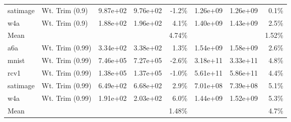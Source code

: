 \begin{table*}[ht]
\begin{center}
\begin{small}
\begin{sc}
\begin{tabular}{llccrccr}
satimage & Wt. Trim (0.9) & 9.87e+02 & 9.76e+02 & -1.2\%  & 1.26e+09 & 1.26e+09 & 0.1\%  \\
w4a & Wt. Trim (0.9) & 1.88e+02 & 1.96e+02 & 4.1\% & 1.40e+09 & 1.43e+09 & 2.5\% \\
\midrule
Mean &  & &  & 4.74\% & & & 1.52\% \\
\midrule
a6a & Wt. Trim (0.99) & 3.34e+02 & 3.38e+02 & 1.3\%  & 1.54e+09 & 1.58e+09 & 2.6\%  \\
mnist & Wt. Trim (0.99) & 7.46e+05 & 7.27e+05 & -2.6\% & 3.18e+11 & 3.33e+11 & 4.8\% \\
rcv1 & Wt. Trim (0.99) & 1.38e+05 & 1.37e+05 & -1.0\% & 5.61e+11 & 5.86e+11 & 4.4\% \\
satimage & Wt. Trim (0.99) & 6.49e+02 & 6.68e+02 & 2.9\%  & 7.01e+08 & 7.39e+08 & 5.1\%  \\
w4a & Wt. Trim (0.99) & 1.91e+02 & 2.03e+02 & 6.0\% & 1.44e+09 & 1.52e+09 & 5.3\% \\
\midrule
Mean &  & &  & 1.48\% & & & 4.7\% \\
\bottomrule
\end{tabular}
\end{sc}
\end{small}
\end{center}
\vskip -0.1in
\end{table*}


